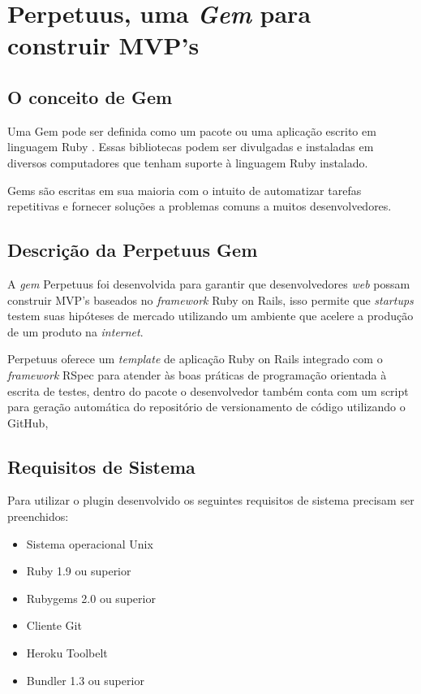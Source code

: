 \chapter{Perpetuus, uma \emph{Gem} para construir MVP's}
\label{cap:gem}

\section{O conceito de Gem}

Uma Gem pode ser definida como um pacote ou uma aplica\c{c}\~ao escrito em linguagem Ruby \cite{berube2007practical}. Essas bibliotecas podem ser divulgadas e instaladas em diversos computadores que tenham suporte \`a linguagem Ruby instalado.

Gems s\~ao escritas em sua maioria com o intuito de automatizar tarefas repetitivas e fornecer solu\c{c}\~oes a problemas comuns a muitos desenvolvedores.

\section{Descri\c{c}\~ao da Perpetuus Gem}

A \emph{gem} Perpetuus foi desenvolvida para garantir que desenvolvedores \emph{web} possam construir MVP's baseados no \emph{framework} Ruby on Rails, isso permite que \emph{startups} testem suas hip\'oteses de mercado utilizando um ambiente que acelere a produ\c{c}\~ao de um produto na \emph{internet}.

Perpetuus oferece um \emph{template} de aplica\c{c}\~ao Ruby on Rails integrado com o \emph{framework} RSpec para atender \`as boas pr\'aticas de programa\c{c}\~ao orientada \`a escrita de testes, dentro do pacote o desenvolvedor tamb\'em conta com um script para gera\c{c}\~ao autom\'atica do reposit\'orio de versionamento de c\'odigo utilizando o GitHub, 

\section{Requisitos de Sistema}

Para utilizar o plugin desenvolvido os seguintes requisitos de sistema precisam ser preenchidos:

\begin{itemize}
\item Sistema operacional Unix
\item Ruby 1.9 ou superior
\item Rubygems 2.0 ou superior
\item Cliente Git
\item Heroku Toolbelt
\item Bundler 1.3 ou superior
\end{itemize} 

